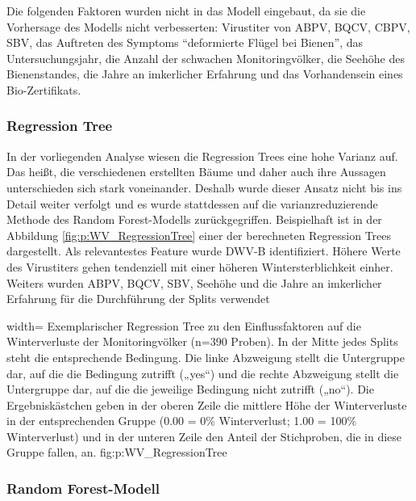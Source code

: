 

Die folgenden Faktoren wurden nicht in das Modell eingebaut, da sie die Vorhersage des Modells nicht verbesserten: Virustiter von ABPV, BQCV, CBPV, SBV, das Auftreten des Symptoms \enquote{deformierte Flügel bei Bienen}, das Untersuchungsjahr, die Anzahl der schwachen Monitoringvölker, die Seehöhe des Bienenstandes, die Jahre an imkerlicher Erfahrung und das Vorhandensein eines Bio-Zertifikats.

\subsubsection{Regression Tree}

In der vorliegenden Analyse wiesen die Regression Trees eine hohe Varianz auf. Das heißt, die verschiedenen erstellten Bäume und daher auch ihre Aussagen unterschieden sich stark voneinander. Deshalb wurde dieser Ansatz nicht bis ins Detail weiter verfolgt und es wurde stattdessen auf die varianzreduzierende Methode des Random Forest-Modells zurückgegriffen. Beispielhaft ist in der Abbildung \ref{fig:p:WV_RegressionTree} einer der berechneten Regression Trees dargestellt. Als relevantestes Feature wurde DWV-B identifiziert. Höhere Werte des Virustiters gehen tendenziell mit einer höheren Wintersterblichkeit einher. Weiters wurden ABPV, BQCV, SBV, Seehöhe und die Jahre an imkerlicher Erfahrung für die Durchführung der Splits verwendet


  {width=\textwidth} %
  {Exemplarischer Regression Tree zu den Einflussfaktoren auf die Winterverluste der Monitoringvölker (n=390 Proben). In der Mitte jedes Splits steht die entsprechende Bedingung. Die linke Abzweigung stellt die Untergruppe dar, auf die die Bedingung zutrifft („yes“) und die rechte Abzweigung stellt die Untergruppe dar, auf die die jeweilige Bedingung nicht zutrifft („no“). Die Ergebniskästchen geben in der oberen Zeile die mittlere Höhe der Winterverluste in der entsprechenden Gruppe (0.00 = 0\% Winterverlust; 1.00 = 100\% Winterverlust) und in der unteren Zeile den Anteil der Stichproben, die in diese Gruppe fallen, an.} %
  {} %
  {fig:p:WV_RegressionTree} %


\subsubsection{Random Forest-Modell}

